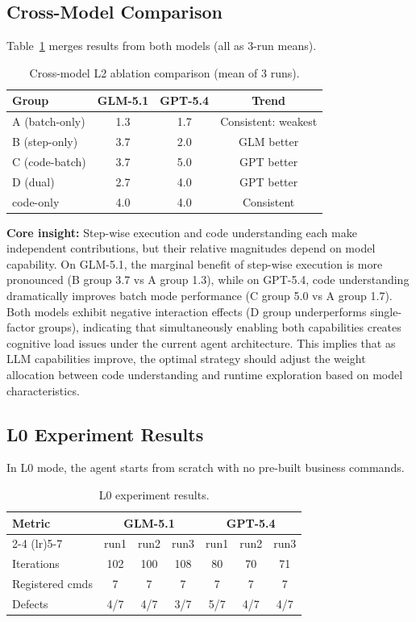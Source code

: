 \documentclass[sigconf,nonacm]{acmart}
\begin{document}
\clearpage
\subsection{Cross-Model Comparison}

Table~\ref{tab:cross-model} merges results from both models (all as 3-run means).

\begin{table}[htbp]
\caption{Cross-model L2 ablation comparison (mean of 3 runs).}
\label{tab:cross-model}
\small
\begin{tabular}{lccc}
\toprule
Group & GLM-5.1 & GPT-5.4 & Trend \\
\midrule
A (batch-only) & 1.3 & 1.7 & Consistent: weakest \\
B (step-only) & 3.7 & 2.0 & GLM better \\
C (code-batch) & 3.7 & 5.0 & GPT better \\
D (dual) & 2.7 & 4.0 & GPT better \\
code-only & 4.0 & 4.0 & Consistent \\
\bottomrule
\end{tabular}
\end{table}

\textbf{Core insight:} Step-wise execution and code understanding each make independent contributions, but their relative magnitudes depend on model capability. On GLM-5.1, the marginal benefit of step-wise execution is more pronounced (B group 3.7 vs A group 1.3), while on GPT-5.4, code understanding dramatically improves batch mode performance (C group 5.0 vs A group 1.7). Both models exhibit negative interaction effects (D group underperforms single-factor groups), indicating that simultaneously enabling both capabilities creates cognitive load issues under the current agent architecture. This implies that as LLM capabilities improve, the optimal strategy should adjust the weight allocation between code understanding and runtime exploration based on model characteristics.

\subsection{L0 Experiment Results}

In L0 mode, the agent starts from scratch with no pre-built business commands.

\begin{table}[htbp]
\caption{L0 experiment results.}
\label{tab:l0}
\small
\begin{tabular}{lcccccc}
\toprule
Metric & \multicolumn{3}{c}{GLM-5.1} & \multicolumn{3}{c}{GPT-5.4} \\
\cmidrule(lr){2-4} \cmidrule(lr){5-7}
 & run1 & run2 & run3 & run1 & run2 & run3 \\
\midrule
Iterations & 102 & 100 & 108 & 80 & 70 & 71 \\
Registered cmds & 7 & 7 & 7 & 7 & 7 & 7 \\
Defects & 4/7 & 4/7 & 3/7 & 5/7 & 4/7 & 4/7 \\
\bottomrule
\end{tabular}
\end{table}
\end{document}
